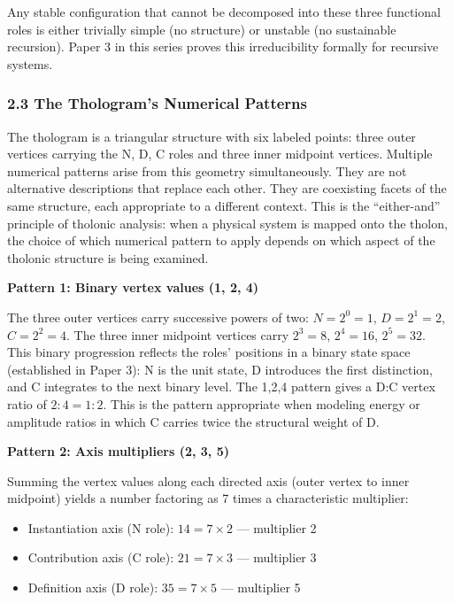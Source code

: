 \documentclass[
  11pt,
  letterpaper,
]{article}
\providecommand{\tightlist}{%
  \setlength{\itemsep}{0pt}\setlength{\parskip}{0pt}}
\begin{document}
Any stable configuration that cannot be decomposed into these three
functional roles is either trivially simple (no structure) or unstable
(no sustainable recursion). Paper 3 in this series proves this
irreducibility formally for recursive systems.

\subsubsection{2.3 The Thologram's Numerical
Patterns}\label{the-tholograms-numerical-patterns}

The thologram is a triangular structure with six labeled points: three
outer vertices carrying the N, D, C roles and three inner midpoint
vertices. Multiple numerical patterns arise from this geometry
simultaneously. They are not alternative descriptions that replace each
other. They are coexisting facets of the same structure, each
appropriate to a different context. This is the ``either-and'' principle
of tholonic analysis: when a physical system is mapped onto the tholon,
the choice of which numerical pattern to apply depends on which aspect
of the tholonic structure is being examined.

\textbf{Pattern 1: Binary vertex values (1, 2, 4)}

The three outer vertices carry successive powers of two:
\(N = 2^0 = 1\), \(D = 2^1 = 2\), \(C = 2^2 = 4\). The three inner
midpoint vertices carry \(2^3 = 8\), \(2^4 = 16\), \(2^5 = 32\). This
binary progression reflects the roles' positions in a binary state space
(established in Paper 3): N is the unit state, D introduces the first
distinction, and C integrates to the next binary level. The 1,2,4
pattern gives a D:C vertex ratio of \(2:4 = 1:2\). This is the pattern
appropriate when modeling energy or amplitude ratios in which C carries
twice the structural weight of D.

\textbf{Pattern 2: Axis multipliers (2, 3, 5)}

Summing the vertex values along each directed axis (outer vertex to
inner midpoint) yields a number factoring as 7 times a characteristic
multiplier:

\begin{itemize}
\tightlist
\item
  Instantiation axis (N role): \(14 = 7 \times 2\) --- multiplier 2
\item
  Contribution axis (C role): \(21 = 7 \times 3\) --- multiplier 3
\item
  Definition axis (D role): \(35 = 7 \times 5\) --- multiplier 5
\end{itemize}
\end{document}
